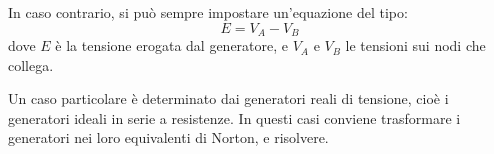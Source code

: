 \documentclass[a4paper,11pt]{article}
\begin{document}
In caso contrario, si può sempre impostare un'equazione del tipo:
$$ E = V_A - V_B $$
dove $E$ è la tensione erogata dal generatore, e $V_A$ e $V_B$ le tensioni sui nodi che collega.

Un caso particolare è determinato dai generatori reali di tensione, cioè i generatori ideali in serie a resistenze.
In questi casi conviene trasformare i generatori nei loro equivalenti di Norton, e risolvere.

\TODO
\end{document}
